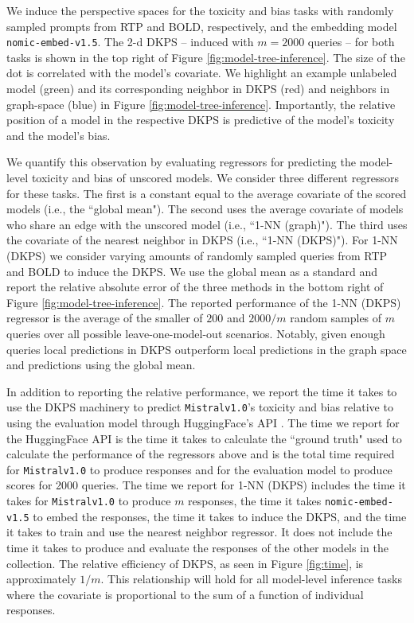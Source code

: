 We induce the perspective spaces for the toxicity and bias tasks with randomly sampled prompts from RTP and BOLD, respectively, and the embedding model \texttt{nomic-embed-v1.5}.
The 2-d DKPS -- induced with $ m=2000 $ queries -- for both tasks is shown in the top right of Figure \ref{fig:model-tree-inference}.
The size of the dot is correlated with the model's covariate.
We highlight an example unlabeled model (green) and its corresponding neighbor in DKPS (red) and neighbors in graph-space (blue) in Figure \ref{fig:model-tree-inference}.
Importantly, the relative position of a model in the respective DKPS is predictive of the model's toxicity and the model's bias.


We quantify this observation by evaluating regressors for predicting the model-level %
toxicity and bias 
of unscored models.
We consider three different regressors for these tasks.
The first is a constant equal to the average covariate of the scored models (i.e., the ``global mean").
The second uses the average covariate of models who share an edge with the unscored model (i.e., ``1-NN (graph)").
The third uses the covariate of the nearest neighbor in DKPS (i.e., ``1-NN (DKPS)").
For 1-NN (DKPS) we consider varying amounts of randomly sampled queries from RTP and BOLD to induce the DKPS.
We use the global mean as a standard and report the relative absolute error of the three methods in the bottom right of Figure \ref{fig:model-tree-inference}.
The reported performance of the 1-NN (DKPS) regressor is the average of the smaller of $ 200 $  and $ 2000 / m $  random samples of $ m $ queries over all possible leave-one-model-out scenarios.
Notably, given enough queries local predictions in DKPS outperform local predictions in the graph space and predictions using the global mean.

In addition to reporting the relative performance, we report the time it takes to use the DKPS machinery to predict \texttt{Mistralv1.0}'s \citep{jiang2023mistral} toxicity and bias relative to using the evaluation model through HuggingFace's API \citep{wolf2019huggingface}.
The time we report for the HuggingFace API is the time it takes to calculate the  ``ground truth" used to calculate the performance of the regressors above and is the total time required for \texttt{Mistralv1.0} to produce responses and for the evaluation model to produce scores for 2000 queries.
The time we report for 1-NN (DKPS) includes the time it takes for \texttt{Mistralv1.0} to produce $ m $ responses, the time it takes \texttt{nomic-embed-v1.5} to embed the responses, the time it takes to induce the DKPS, and the time it takes to train and use the nearest neighbor regressor.
It does not include the time it takes to produce and evaluate the responses of the other models in the collection.
The relative efficiency of DKPS, as seen in Figure \ref{fig:time}, is approximately $ 1 / m $.
This relationship will hold for all model-level inference tasks where the covariate is proportional to the sum of a function of individual responses. 

